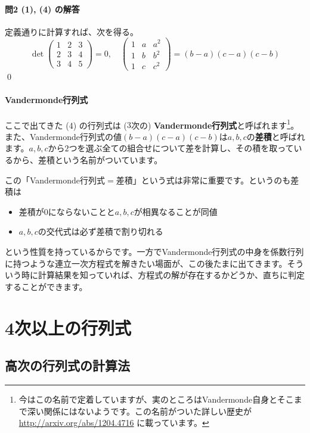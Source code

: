 \paragraph{問2 (1), (4) の解答} 定義通りに計算すれば、次を得る。
\[
\det
\begin{pmatrix}
1 & 2 & 3 \\
2 & 3 & 4 \\
3 & 4 & 5
\end{pmatrix}
= 0, \quad
\begin{pmatrix}
1 & a & a^2 \\
1 & b & b^2 \\
1 & c & c^2
\end{pmatrix}
= (b - a)(c - a)(c - b)
\]
\qed

\paragraph{Vandermonde行列式} ここで出てきた (4) の行列式は ($3$次の) \textbf{Vandermonde行列式}と呼ばれます\footnote{今はこの名前で定着していますが、実のところはVandermonde自身とそこまで深い関係にはないようです。この名前がついた詳しい歴史が \url{http://arxiv.org/abs/1204.4716} に載っています。}。また、Vandermonde行列式の値$(b - a)(c - a)(c - b)$は$a, b, c$の\textbf{差積}と呼ばれます。$a, b, c$から$2$つを選ぶ全ての組合せについて差を計算し、その積を取っているから、差積という名前がついています。

この「Vandermonde行列式$=$差積」という式は非常に重要です。というのも差積は
\begin{itemize}
\item 差積が$0$にならないことと$a, b, c$が相異なることが同値
\item $a, b, c$の交代式は必ず差積で割り切れる
\end{itemize}
という性質を持っているからです。一方でVandermonde行列式の中身を係数行列に持つような連立一次方程式を解きたい場面が、この後たまに出てきます。そういう時に計算結果を知っていれば、方程式の解が存在するかどうか、直ちに判定することができます。

\section{4次以上の行列式}

\subsection{高次の行列式の計算法}

